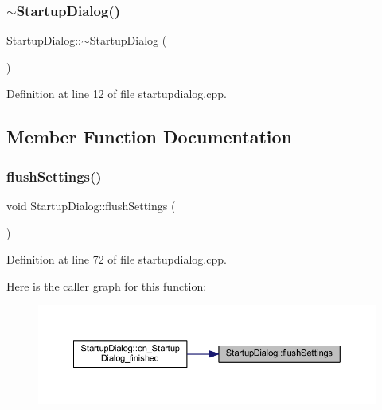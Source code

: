 \subsubsection{\texorpdfstring{$\sim$StartupDialog()}{~StartupDialog()}}
{\footnotesize\ttfamily Startup\+Dialog\+::$\sim$\+Startup\+Dialog (\begin{DoxyParamCaption}{ }\end{DoxyParamCaption})}



Definition at line 12 of file startupdialog.\+cpp.



\subsection{Member Function Documentation}
\mbox{\label{class_startup_dialog_a59d1dc04138b5f7d53ca0b819a61068e}} 
\subsubsection{\texorpdfstring{flushSettings()}{flushSettings()}}
{\footnotesize\ttfamily void Startup\+Dialog\+::flush\+Settings (\begin{DoxyParamCaption}{ }\end{DoxyParamCaption})\hspace{0.3cm}{\ttfamily [private]}}



Definition at line 72 of file startupdialog.\+cpp.

Here is the caller graph for this function\+:
\nopagebreak
\begin{figure}[H]
\begin{center}
\leavevmode
\includegraphics[width=350pt]{class_startup_dialog_a59d1dc04138b5f7d53ca0b819a61068e_icgraph}
\end{center}
\end{figure}
\mbox{\label{class_startup_dialog_a931800d2e42ff7172a2245252f04c622}} 
